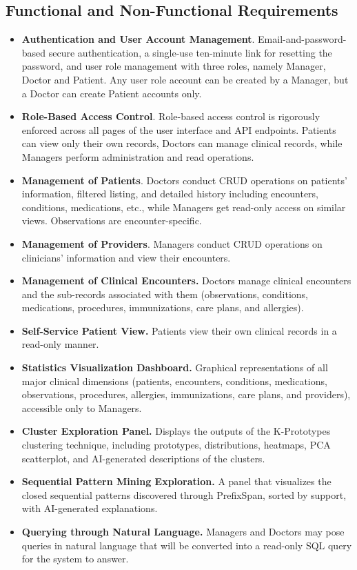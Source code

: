\subsection{Functional and Non-Functional Requirements}
\begin{itemize}
    \item \textbf{Authentication and User Account Management}. Email-and-password-based secure authentication, a single-use ten-minute link for resetting the password, and user role management with three roles, namely Manager, Doctor and Patient. Any user role account can be created by a Manager, but a Doctor can create Patient accounts only.
    \item \textbf{Role-Based Access Control}. Role-based access control is rigorously enforced across all pages of the user interface and API endpoints. Patients can view only their own records, Doctors can manage clinical records, while Managers perform administration and read operations.
    \item \textbf{Management of Patients}. Doctors conduct CRUD operations on patients' information, filtered listing, and detailed history including encounters, conditions, medications, etc., while Managers get read-only access on similar views. Observations are encounter-specific.
    \item \textbf{Management of Providers}. Managers conduct CRUD operations on clinicians' information and view their encounters.
    \item \textbf{Management of Clinical Encounters.} Doctors manage clinical encounters and the sub-records associated with them (observations, conditions, medications, procedures, immunizations, care plans, and allergies).
    \item \textbf{Self-Service Patient View.} Patients view their own clinical records in a read-only manner.
    \item \textbf{Statistics Visualization Dashboard.} Graphical representations of all major clinical dimensions (patients, encounters, conditions, medications, observations, procedures, allergies, immunizations, care plans, and providers), accessible only to Managers.
    \item \textbf{Cluster Exploration Panel.} Displays the outputs of the K-Prototypes clustering technique, including prototypes, distributions, heatmaps, PCA scatterplot, and AI-generated descriptions of the clusters.
    \item \textbf{Sequential Pattern Mining Exploration.} A panel that visualizes the closed sequential patterns discovered through PrefixSpan, sorted by support, with AI-generated explanations.
    \item \textbf{Querying through Natural Language.} Managers and Doctors may pose queries in natural language that will be converted into a read-only SQL query for the system to answer.
\end{itemize}

